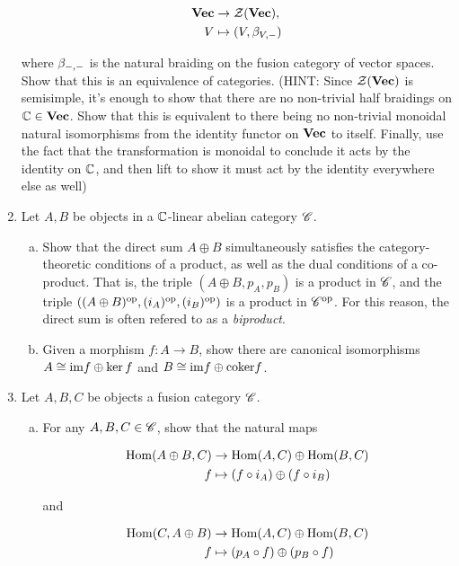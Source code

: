 \documentclass{article}
\theoremstyle{definition}
\numberwithin{figure}{section}
\begin{document}
\begin{enumerate}[\thesection .1.]
\begin{align*}
\bold{Vec} &\to \mathcal{Z}(\bold{Vec}),\\
V &\mapsto (V,\beta_{V,\--})
\end{align*}

where $\beta_{\--,\--}$ is the natural braiding on the fusion category of vector spaces. Show that this is an equivalence of categories. (HINT: Since $\mathcal{Z}(\bold{Vec})$ is semisimple, it's enough to show that there are no non-trivial half braidings on $\mathbb{C}\in \bold{Vec}$. Show that this is equivalent to there being no non-trivial monoidal natural isomorphisms from the identity functor on $\bold{Vec}$ to itself. Finally, use the fact that the transformation is monoidal to conclude it acts by the identity on $\mathbb{C}$, and then lift to show it must act by the identity everywhere else as well)

\item Let $A,B$ be objects in a $\mathbb{C}$-linear abelian category $\mathscr{C}$.

\begin{enumerate}[(a)]
\item Show that the direct sum  $A\oplus B$ simultaneously satisfies the category-theoretic conditions of a product, as well as the dual conditions of a co-product. That is, the triple $(A\oplus B, p_A, p_B)$ is a product in $\mathscr{C}$, and the triple $((A\oplus B)^{\mathrm{op}}, (i_A)^{\mathrm{op}},(i_B)^{\mathrm{op}})$ is a product in $\mathscr{C}^{\mathrm{op}}$. For this reason, the direct sum is often refered to as a \textit{biproduct}.

\item Given a morphism $f:A\to B$, show there are canonical isomorphisms $A\cong \mathrm{im} f\oplus \ker f$ and $B\cong \mathrm{im} f\oplus \mathrm{coker} f$.
\end{enumerate}

\item Let $A,B,C$ be objects a fusion category $\mathscr{C}$.

\begin{enumerate}[(a)]

\item For any $A,B,C\in \mathscr{C}$, show that the natural maps

\begin{align*}
\mathrm{Hom}(A\oplus B,C)&\to \mathrm{Hom}(A,C)\oplus \mathrm{Hom}(B,C)\\
f & \mapsto (f\circ i_A)\oplus (f\circ i_B)
\end{align*}

and

\begin{align*}
\mathrm{Hom}(C, A\oplus B)&\to \mathrm{Hom}(A,C)\oplus \mathrm{Hom}(B,C)\\
f &\mapsto (p_A\circ f)\oplus (p_B\circ f)
\end{align*}


\end{enumerate}
\end{enumerate}
\end{document}
